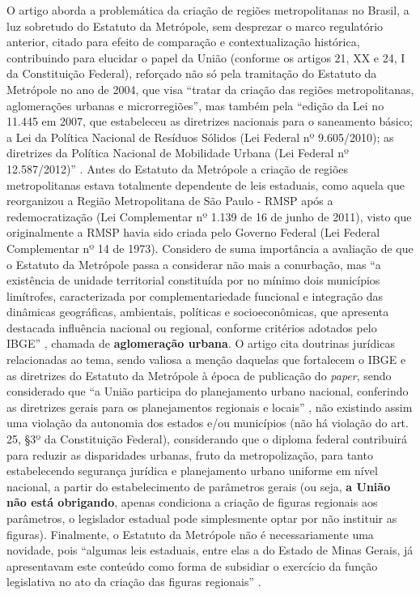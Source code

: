 \documentclass[hidelinks,a4paper,nofootinbib,aps,reprint,superscriptaddress]{revtex4}
\begin{document}
	O artigo aborda a problemática da criação de regiões metropolitanas no Brasil, a luz sobretudo do Estatuto da Metrópole, sem desprezar o marco regulatório anterior, citado para efeito de comparação e contextualização histórica, contribuindo para elucidar o papel da União (conforme os artigos 21, XX e 24, I da Constituição Federal), reforçado não só pela tramitação do Estatuto da Metrópole no ano de 2004, que visa ``tratar da criação das regiões metropolitanas, aglomerações
	urbanas e microrregiões'', mas também pela ``edição da Lei no 11.445 em 2007, que estabeleceu as diretrizes nacionais para o saneamento 	básico; a Lei da Política Nacional de Resíduos Sólidos (Lei Federal nº 9.605/2010); as diretrizes da 	Política Nacional de Mobilidade Urbana (Lei Federal nº 12.587/2012)'' \cite[p.3]{mencio2017}. Antes do Estatuto da Metrópole a criação de regiões metropolitanas estava totalmente dependente de leis estaduais, como aquela que reorganizou a Região Metropolitana de São Paulo - RMSP após a redemocratização (Lei Complementar nº 1.139 de 16 de junho de 2011), visto que originalmente a RMSP havia sido criada pelo Governo Federal (Lei Federal Complementar nº 14 de 1973). Considero de suma importância a avaliação de que o Estatuto da Metrópole passa a considerar não mais a conurbação, mas ``a existência de unidade territorial constituída por no mínimo dois municípios limítrofes, caracterizada por complementariedade funcional e integração das dinâmicas geográficas, ambientais, políticas e socioeconômicas, que apresenta destacada influência nacional ou regional, conforme critérios adotados pelo IBGE'' \cite[p.5]{mencio2017}, chamada de \textbf{aglomeração urbana}. O artigo cita doutrinas jurídicas relacionadas ao tema, sendo valiosa a menção daquelas que fortalecem o IBGE e as diretrizes do Estatuto da Metrópole à época de publicação do \textit{paper}, sendo considerado que ``a União participa do planejamento urbano nacional, conferindo as diretrizes gerais para os planejamentos regionais e locais'' \cite[p.18]{mencio2017}, não existindo assim uma violação da autonomia dos estados e/ou municípios (não há violação do art. 25, §3º da Constituição Federal), considerando que o diploma federal contribuirá para reduzir as disparidades urbanas, fruto da metropolização, para tanto estabelecendo segurança jurídica e planejamento urbano uniforme em nível nacional, a partir do estabelecimento de parâmetros gerais (ou seja, \textbf{a União não está obrigando}, apenas condiciona a criação de figuras regionais aos parâmetros, o legislador estadual pode simplesmente optar por não instituir as figuras). Finalmente, o Estatuto da Metrópole não é necessariamente uma novidade, pois ``algumas leis estaduais, entre elas a do Estado de Minas Gerais, já apresentavam este conteúdo como forma de subsidiar o exercício da função legislativa no ato da criação das figuras regionais'' \cite[p.20]{mencio2017}.
	
\end{document}
